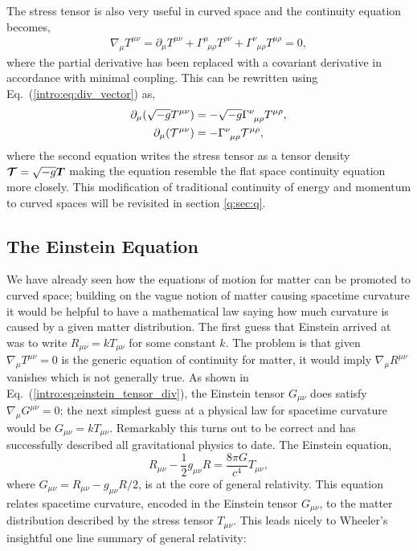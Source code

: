 The stress tensor is also very useful in curved space and the continuity equation becomes,
\begin{align}
\nabla_\mu T^{\mu\nu} = \partial_\mu T^{\mu\nu}  + \Gamma^\mu_{\,\,\,\mu \rho}T^{\rho \nu}  + \Gamma^\nu_{\,\,\,\mu\rho}T^{\mu\rho}= 0\label{intro:eq:cont},
\end{align}
where the partial derivative has been replaced with a covariant derivative in accordance with minimal coupling. This can be rewritten using Eq.~(\ref{intro:eq:div_vector}) as, 
\begin{align}
\partial_\mu( \sqrt{-g} T^{\mu\nu})  &=-\sqrt{-g} \Gamma^\nu_{\,\,\,\mu\rho}T^{\mu\rho},\\
\partial_\mu( \mathcal{T}^{\mu\nu})  &=-\Gamma^\nu_{\,\,\,\mu\rho}\mathcal{T}^{\mu\rho},
\end{align}
where the second equation writes the stress tensor as a tensor density $\boldsymbol{\mathcal{T}} = \sqrt{-g} \boldsymbol{T}$ making the equation resemble the flat space continuity equation more closely. This modification of traditional continuity of energy and momentum to curved spaces will be revisited in section \ref{q:sec:q}.


\subsection{The Einstein Equation}
We have already seen how the equations of motion for matter can be promoted to curved space; building on the vague notion of matter causing spacetime curvature it would be helpful to have a mathematical law saying how much curvature is caused by a given matter distribution. The first guess that Einstein arrived at was to write $R_{\mu\nu}=kT_{\mu\nu}$ for some constant $k$. The problem is that given $\nabla_\mu T^{\mu\nu}=0$ is the generic equation of continuity for matter, it would imply $\nabla_\mu R^{\mu\nu}$ vanishes which is not generally true. As shown in Eq.~(\ref{intro:eq:einstein_tensor_div}), the Einstein tensor $G_{\mu\nu}$ does satisfy $\nabla_\mu G^{\mu\nu}=0$; the next simplest guess at a physical law for spacetime curvature would be $G_{\mu\nu} = k T_{\mu\nu}$. Remarkably this turns out to be correct and has successfully described all gravitational physics to date. The Einstein equation,
\begin{equation}\label{intro:eq:einstein}
R_{\mu\nu} - \frac{1}{2}g_{\mu\nu}R = \frac{8 \pi G}{c^4}T_{\mu\nu},
\end{equation}
where $G_{\mu\nu} = R_{\mu\nu}- g_{\mu\nu}R/2$, is at the core of general relativity. This equation relates spacetime curvature, encoded in the Einstein tensor $G_{\mu\nu}$, to the matter distribution described by the stress tensor $T_{\mu\nu}$. This leads nicely to Wheeler's insightful one line summary of general relativity: 

